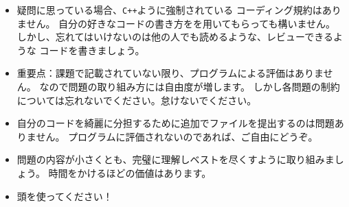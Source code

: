 \begin{itemize}
        \item 疑問に思っている場合、\texttt{C++}ように強制されている
            コーディング規約はありません。
            自分の好きなコードの書き方をを用いてもらっても構いません。
            しかし、忘れてはいけないのは他の人でも読めるような、レビューできるような
            コードを書きましょう。

	    \item 重要点：課題で記載されていない限り、プログラムによる評価はありません。
            なので問題の取り組み方には自由度が増します。
            しかし各問題の制約については忘れないでください。怠けないでください。

		\item 自分のコードを綺麗に分担するために追加でファイルを提出するのは問題ありません。
            プログラムに評価されないのであれば、ご自由にどうぞ。

		\item 問題の内容が小さくとも、完璧に理解しベストを尽くすように取り組みましょう。
            時間をかけるほどの価値はあります。

        \item 頭を使ってください！

\end{itemize}

\newpage
